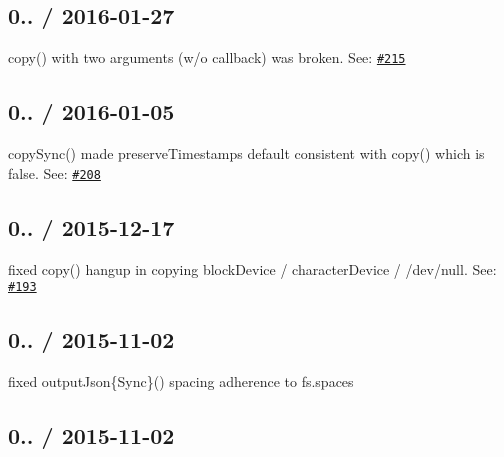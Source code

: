 \subsection*{0.. / 2016-\/01-\/27 }


\begin{DoxyItemize}
\item {\ttfamily copy()} with two arguments (w/o callback) was broken. See\+: \href{https://github.com/jprichardson/node-fs-extra/pull/215}{\tt \#215}
\end{DoxyItemize}

\subsection*{0.. / 2016-\/01-\/05 }


\begin{DoxyItemize}
\item {\ttfamily copy\+Sync()} made {\ttfamily preserve\+Timestamps} default consistent with {\ttfamily copy()} which is {\ttfamily false}. See\+: \href{https://github.com/jprichardson/node-fs-extra/pull/208}{\tt \#208}
\end{DoxyItemize}

\subsection*{0.. / 2015-\/12-\/17 }


\begin{DoxyItemize}
\item fixed {\ttfamily copy()} hangup in copying block\+Device / character\+Device / {\ttfamily /dev/null}. See\+: \href{https://github.com/jprichardson/node-fs-extra/issues/193}{\tt \#193}
\end{DoxyItemize}

\subsection*{0.. / 2015-\/11-\/02 }


\begin{DoxyItemize}
\item fixed {\ttfamily output\+Json\{Sync\}()} spacing adherence to {\ttfamily fs.\+spaces}
\end{DoxyItemize}

\subsection*{0.. / 2015-\/11-\/02 }


